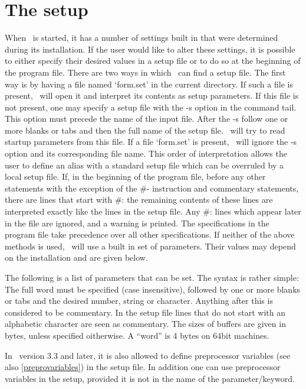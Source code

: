 
\chapter{The setup}
\label{setup}

When \FORM\ is started, it has a number of settings built in 
that were determined during its installation. If the 
user would like to alter these settings, it is possible to either specify 
their desired values in a setup file or to do so at the 
beginning of the program file. There are two ways in 
which \FORM\ can find a setup file. The first way is by having a file named 
`form.set' in the current directory. If such a file is 
present, \FORM\ will open it and interpret its contents as setup parameters. 
If this file is not present, one may specify a setup file with the -s 
option in the command tail. This option must precede the name of the input 
file. After the -s follow one or more blanks or tabs and then the full name 
of the setup file. \FORM\ will try to read startup parameters from this file. 
If a file `form.set' is present, \FORM\ will ignore the -s option and its 
corresponding file name. This order of interpretation allows the user to 
define an alias with a standard setup file which can be overruled by a 
local setup file. If, in the beginning of the program file, before any 
other statements with the exception of the \#- instruction and commentary 
statements, there are lines that start with \#: the remaining contents of 
these lines are interpreted exactly like the lines in the setup file.
Any \#: lines which appear later in the file are ignored, and a warning
is printed. The
specifications in the program file take precedence over 
all other specifications. If neither of the above methods is used, \FORM\ 
will use a built in set of parameters. Their values may depend on the 
installation and are given below. 

The following is a list of parameters that can be set. The syntax is rather 
simple: The full word must be specified (case insensitive), followed by one 
or more blanks or tabs and the desired number, string or character. 
Anything after this is considered to be commentary. In the setup file lines 
that do not start with an alphabetic character are seen as commentary. The
sizes of buffers are given in bytes, unless specified oitherwise. A ``word''
is 4 bytes on 64bit machines.

In \FORM\ version 3.3 and later, it is also allowed to define 
preprocessor variables (see also 
\ref{preprovariables}) in the setup file. In addition one can use 
preprocessor variables in the setup, provided it is not in the name of the 
parameter/keyword.

